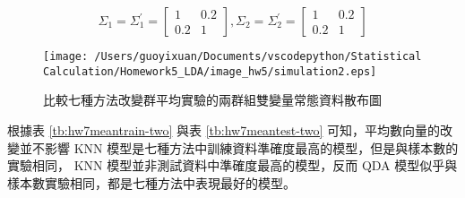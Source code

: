 $$ \Sigma_1 = \Sigma_1^{'}= \left[
            \begin{array}{clr}
                1 & 0.2  \\
                0.2 & 1
            \end{array} \right] ,
            \Sigma_2 = \Sigma_2^{'} = \left[
            \begin{array}{clr}
                1 & 0.2  \\
                0.2 & 1 
            \end{array} \right]  $$

\begin{figure}[H]
    \centering
        \texttt{[image: /Users/guoyixuan/Documents/vscodepython/Statistical Calculation/Homework5\_LDA/image\_hw5/simulation2.eps]}
    \caption{比較七種方法改變群平均實驗的兩群組雙變量常態資料散布圖}
    \label{fig:hw7mean-two}
\end{figure} 

\renewcommand\arraystretch{1.5}
\begin{table}[h]
\scriptsize
\setlength{\belowcaptionskip}{0pt}
\centering
\caption{七種機器學習方法改變群平均的兩群組訓練資料分類錯誤率}\label{tb:hw7meantrain-two}
\end{table}

根據表 \ref{tb:hw7meantrain-two} 與表 \ref{tb:hw7meantest-two} 可知，平均數向量的改變並不影響 KNN 模型是七種方法中訓練資料準確度最高的模型，但是與樣本數的實驗相同， KNN 模型並非測試資料中準確度最高的模型，反而 QDA 模型似乎與樣本數實驗相同，都是七種方法中表現最好的模型。

\renewcommand\arraystretch{1.5}
\begin{table}[h]
\scriptsize
\setlength{\belowcaptionskip}{0pt}
\centering
\caption{七種機器學習方法改變群平均的兩群組測試資料分類錯誤率}\label{tb:hw7meantest-two}
\end{table}

